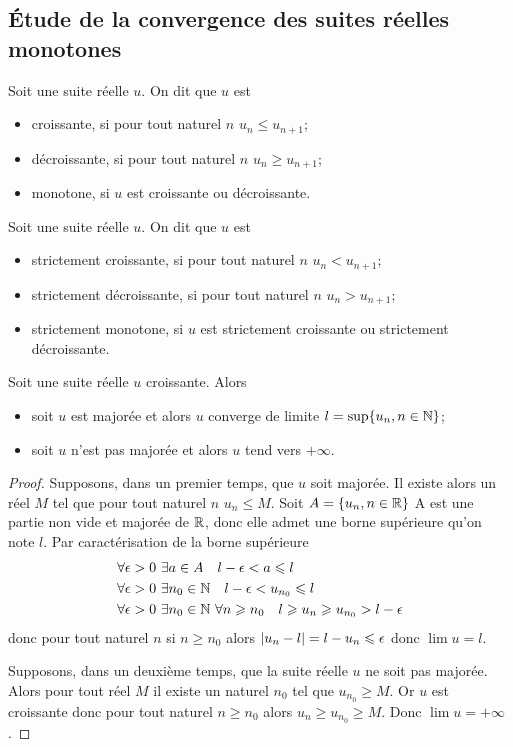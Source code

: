\subsection{Étude de la convergence des suites réelles monotones}

\begin{defdef}
  Soit une suite réelle $u$. On dit que $u$ est
  \begin{itemize}
  \item croissante, si pour tout naturel $n$ $u_n \leqslant u_{n+1}$;
  \item décroissante, si pour tout naturel $n$ $u_n \geqslant u_{n+1}$;
  \item monotone, si $u$ est croissante ou décroissante.
  \end{itemize}
\end{defdef}
\begin{defdef}
  Soit une suite réelle $u$. On dit que $u$ est
  \begin{itemize}
  \item strictement croissante, si pour tout naturel $n$ $u_n < u_{n+1}$;
  \item strictement décroissante, si pour tout naturel $n$ $u_n > u_{n+1}$;
  \item strictement monotone, si $u$ est strictement croissante ou strictement décroissante.
  \end{itemize}
\end{defdef}
\begin{theo}
  Soit une suite réelle $u$ croissante. Alors
  \begin{itemize}
  \item soit $u$ est majorée et alors $u$ converge de limite $l=\sup\{u_n, n \in \mathbb{N}\}$;
  \item soit $u$ n'est pas majorée et alors $u$ tend vers $+\infty$.
  \end{itemize}
\end{theo}
\begin{proof}
  Supposons, dans un premier temps, que $u$ soit majorée. Il existe alors un réel $M$ tel que pour tout naturel $n$ $u_n \leqslant M$. Soit $A=\{u_n, n \in \mathbb{R}\}$ A est une partie non vide et majorée de $\mathbb{R}$, donc elle admet une borne supérieure qu'on note $l$. Par caractérisation de la borne supérieure
  \begin{align}
      \forall \epsilon > 0 & \ \exists a \in A \quad l-\epsilon < a \leqslant l \\
      \forall \epsilon > 0 & \ \exists n_0 \in \mathbb{N} \quad l-\epsilon < u_{n_0} \leqslant l \\
      \forall \epsilon > 0 & \ \exists n_0 \in \mathbb{N} \ \forall n \geqslant n_0 \quad l \geqslant u_n \geqslant u_{n_0} > l-\epsilon
  \end{align}
donc pour tout naturel $n$ si $n \geqslant n_0$ alors $\left\lvert u_n-l\right\rvert=l-u_n \leqslant \epsilon$ donc $\lim u =l$.

Supposons, dans un deuxième temps, que la suite réelle $u$ ne soit pas majorée. Alors pour tout réel $M$ il existe un naturel $n_0$ tel que $u_{n_0} \geqslant M$. Or $u$ est croissante donc pour tout naturel $n \geqslant n_0$ alors $u_n \geqslant u_{n_0} \geqslant M$. Donc $\lim u =+\infty$.
\end{proof}
